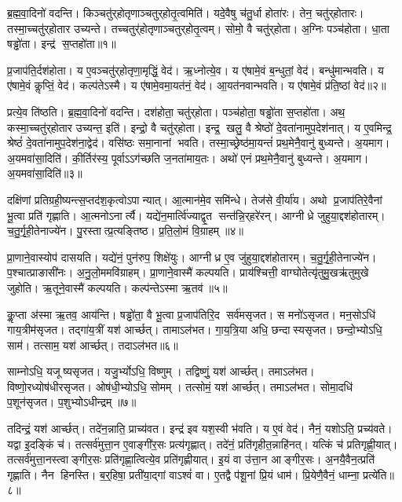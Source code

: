 ब्र॒ह्म॒वा॒दिनो॑ वदन्ति।
किञ्चतु॑र्‌होतृणाञ्चतुर्‌होतृ॒त्वमिति॑।
यदे॒वैषु च॑तु॒र्धा होता॑रः।
तेन॒ चतु॑र्‌होतारः।
तस्मा॒च्चतु॑र्‌होतार उच्यन्ते।
तच्चतुर्॑होतृणाञ्चतुर्‌होतृ॒त्वम्।
सोमो॒ वै चतु॑र्‌होता।
अ॒ग्निः पञ्च॑होता।
धा॒ता षड्ढो॑ता।
इन्द्र॑ स॒प्तहो॑ता॥१॥

प्र॒जाप॑ति॒र्दश॑होता।
य ए॒वञ्चतु॑र्‌होतृणा॒मृद्धिं॒ वेद॑।
ऋ॒ध्नोत्ये॒व।
य ए॑षामे॒वं ब॒न्धुतां॒ वेद॑।
बन्धु॑मान्भवति।
य ए॑षामे॒वं कॢप्तिं॒ वेद॑।
कल्प॑तेऽस्मै।
य ए॑षामे॒वमा॒यत॑नं॒ वेद॑।
आ॒यत॑नवान्भवति।
य ए॑षामे॒वं प्र॑ति॒ष्ठां वेद॑॥२॥

प्रत्ये॒व ति॑ष्ठति।
ब्र॒ह्म॒वा॒दिनो॑ वदन्ति।
दश॑होता॒ चतु॑र्‌होता।
पञ्च॑होता॒ षड्ढो॑ता स॒प्तहो॑ता।
अथ॒ कस्मा॒च्चतु॑र्‌होतार उच्यन्त॒ इति॑।
इन्द्रो॒ वै चतु॑र्‌होता।
इन्द्र॒ खलु॒ वै श्रेष्ठो॑ दे॒वता॑नामुप॒देश॑नात्।
य ए॒वमिन्द्र॒ श्रेष्ठं॑ दे॒वता॑नामुप॒देश॑ना॒द्वेद॑।
वसि॑ष्ठः समा॒नानां भवति।
तस्मा॒च्छ्रेष्ठ॑मा॒यन्तं॑ प्रथ॒मेनै॒वानु॑ बुध्यन्ते।
अ॒यमाग\sn{}।
अ॒यमवा॑सा॒दिति॑।
की॒र्तिर॑स्य॒ पूर्वाऽऽग॑च्छति ज॒नता॑माय॒तः।
अथो॑ एनं प्रथ॒मेनै॒वानु॑ बुध्यन्ते।
अ॒यमाग\sn{}।
अ॒यमवा॑सा॒दिति॑॥३॥\anuvakamend[स॒प्तहो॑ता प्रति॒ष्ठां वेद॑ बुध्यन्ते॒ षट्च॑]

दक्षि॑णां प्रतिग्रही॒ष्यन्त्स॒प्तद॑श॒कृत्वोऽपान्यात्।
आ॒त्मान॑मे॒व समि॑न्धे।
तेज॑से वी॒र्या॑य।
अथो प्र॒जाप॑तिरे॒वैनां भू॒त्वा प्रति॑ गृह्णाति।
आ॒त्मनोऽनार्त्यै।
यद्ये॑न॒मार्त्वि॑ज्याद्वृ॒त सन्त॑न्नि॒र्‌हरे॑रन्।
आग्नीध्रे जुहुया॒द्दश॑होतारम्।
च॒तु॒र्गृ॒ही॒तेनाज्ये॑न।
पु॒रस्तात्प्र॒त्यङ्तिष्ठ\sn{}।
प्र॒ति॒लो॒मं वि॒ग्राहम्॥४॥

प्रा॒णाने॒वास्योप॑ दासयति।
यद्ये॑नं॒ पुन॑रुप॒ शिक्षे॑युः।
आग्नीध्र ए॒व जु॑हुया॒द्दश॑होतारम्।
च॒तु॒र्गृ॒ही॒तेनाज्ये॑न।
प॒श्चात्प्राङासी॑नः।
अ॒नु॒लो॒ममवि॑ग्राहम्।
प्रा॒णाने॒वास्मै॑ कल्पयति।
प्राय॑श्चित्ती॒ वाग्घोतेत्यृ॑तुमु॒खऋ॑तुमुखे जुहोति।
ऋ॒तूने॒वास्मै॑ कल्पयति।
कल्प॑न्तेऽस्मा ऋ॒तव॑॥५॥

कॢ॒प्ता अ॑स्मा ऋ॒तव॒ आय॑न्ति।
षड्ढो॑ता॒ वै भू॒त्वा प्र॒जाप॑तिरि॒द सर्व॑मसृजत।
स मनो॑ऽसृजत।
मन॒सोऽधि॑ गाय॒त्रीम॑सृजत।
तद्गा॑य॒त्रीं यश॑ आर्च्छत्।
तामाऽल॑भत।
गा॒य॒त्रि॒या अधि॒ छन्दास्यसृजत।
छन्दो॒भ्योऽधि॒ साम॑।
तत्साम॒ यश॑ आर्च्छत्।
तदाऽल॑भत॥६॥

साम्नोऽधि॒ यजूष्यसृजत।
यजु॒र्भ्योऽधि॒ विष्णुम्।
तद्विष्णुं॒ यश॑ आर्च्छत्।
तमाऽल॑भत।
विष्णो॒रध्योष॑धीरसृजत।
ओष॑धी॒भ्योऽधि॒ सोमम्।
तत्सोमं॒ यश॑ आर्च्छत्।
तमाऽल॑भत।
सोमा॒दधि॑ प॒शून॑सृजत।
प॒शुभ्योऽधीन्द्रम्॥७॥

तदिन्द्रं॒ यश॑ आर्च्छत्।
तदे॑न॒न्नाति॒ प्राच्य॑वत।
इन्द्र॑ इव यश॒स्वी भ॑वति।
य ए॒वं वेद॑।
नैनं॒ यशोऽति॒ प्रच्य॑वते।
यद्वा इ॒दङ्किं च॑।
तत्सर्व॑मुत्ता॒न ए॒वाङ्गी॑र॒सः प्रत्य॑गृह्णात्।
तदे॑नं॒ प्रति॑गृहीत॒न्नाहि॑नत्।
यत्किं च॑ प्रतिगृह्णी॒यात्।
तत्सर्व॑मुत्ता॒नस्त्वाङ्गीर॒सः प्रति॑गृह्णा॒त्वित्ये॒व प्रति॑गृह्णीयात्।
इ॒यं वा उ॑त्ता॒न आङ्गीर॒सः।
अ॒नयै॒वैन॒त्प्रति॑ गृह्णाति।
नैन हिनस्ति।
ब॒र्॒हिषा॒ प्रती॑या॒द्गां वाऽश्वं॑ वा।
ए॒तद्वै प॑शू॒नां प्रि॒यं धाम॑।
प्रि॒येणै॒वैनं॒ धाम्ना॒ प्रत्ये॑ति॥८॥\anuvakamend[वि॒ग्राह॑मृ॒तव॒स्तदाऽल॑भ॒तेन्द्र॑ङ्गृह्णीया॒थ्षट्च॑]

